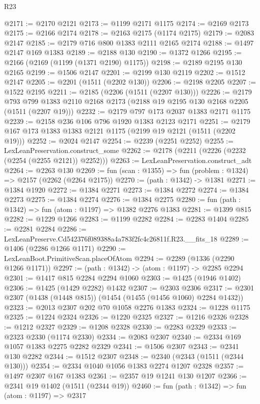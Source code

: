 \begin{lexlean}{R23}
\begin{coremodule}
@2171 := @2170 @2121
@2173 := @1199 @2171 @1175
@2174 := @2169 @2173
@2175 := @2166 @2174
@2178 := @2163 @2175 (@1174 @2175)
@2179 := @2083 @2147
@2185 := @2179 @716 @800 @1383 @2111 @2165 @2174
@2188 := @1497 @2147 @169 @1383
@2189 := @2188 @130
@2190 := @1372 @1266
@2195 := @2166 (@2169 (@1199 (@1371 @2190) @1175))
@2198 := @2189 @2195 @130 @2165
@2199 := @1506 @2147
@2201 := @2199 @130 @2119
@2202 := @1512 @2147
@2205 := @2201 (@1511 (@2202 @130))
@2206 := @2198 @2205
@2207 := @1522 @2195
@2211 := @2185 (@2206 (@1511 (@2207 @130)))
@2226 := @2179
    @793
    @799
    @1383
    @2110
    @2168
    @2173
    (@2188 @19 @2195 @130 @2168 @2205 (@1511 (@2207 @19)))
@2232 := @2179 @797 @173 @2037 @1383 @2171 @1175
@2239 := @2158 @236 @106 @796 @1920 @1383 @2123 @2171
@2251 := @2179 @167 @173 @1383 @1383 @2121 @1175 (@2199 @19 @2121 (@1511 (@2202 @19)))
@2252 := @2024 @2147
@2254 := @2239 (@2251 @2252)
@2255 := LexLeanPreservation.construct_some
@2262 := @2178 (@2211 (@2226 (@2232 (@2254 (@2255 @2121)) @2252)))
@2263 := LexLeanPreservation.construct_adt
@2264 := @2263 @130
@2269 := fun (scan : @1355) => fun (problem : @1324) => @2157 (@2262 (@2264 @2175))
@2270 := (path : @1342) -> @1381
@2271 := @1384 @1920
@2272 := @1384 @2271
@2273 := @1384 @2272
@2274 := @1384 @2273
@2275 := @1384 @2274
@2276 := @1384 @2275
@2280 := fun (path : @1342) => fun (atom : @1197) => @1382 @2276 @1383
@2281 := @1399 @815
@2282 := @1229 @1266
@2283 := @1199 @2282
@2284 := @2283 @1404
@2285 := @2281 @2284
@2286 := LexLeanPreserve.Cd542376f089388a4a783f2fc4c26811f.R23.__fits_18
@2289 := @1406 (@2286 @1266 @1171)
@2290 := LexLeanBoot.PrimitiveScan.placeOfAtom
@2294 := @2289 (@1336 (@2290 @1266 @1171))
@2297 := (path : @1342) -> (atom : @1197) -> @2285 @2294
@2301 := @1417 @815 @2284 @2294 @1060
@2303 := @1425 (@1946 @1402)
@2306 := @1425 (@1429 @2282) @1432
@2307 := @2303 @2306
@2317 := @2301 @2307 (@1438 (@1448 @815)) (@1454 (@1455 (@1456 @1060) @2284 @1432))
@2323 := @2013 @2307 @202 @70 @1058 @2276 @1383
@2324 := @1228 @1175
@2325 := @1224 @2324
@2326 := @1220 @2325
@2327 := @1216 @2326
@2328 := @1212 @2327
@2329 := @1208 @2328
@2330 := @2283 @2329
@2333 := @2323 @2330 (@1174 @2330)
@2334 := @2083 @2307
@2340 := @2334 @169 @1057 @1383 @2275 @2282 @2329
@2341 := @1506 @2307
@2343 := @2341 @130 @2282
@2344 := @1512 @2307
@2348 := @2340 (@2343 (@1511 (@2344 @130)))
@2354 := @2334 @1040 @1056 @1383 @2274 @1207 @2328
@2357 := @1497 @2307 @167 @1383
@2361 := @2357 @19 @1241 @130 @1207
@2366 := @2341 @19 @1402 (@1511 (@2344 @19))
@2460 := fun (path : @1342) =>
  fun (atom : @1197) =>
  @2317

\end{coremodule}
\end{lexlean}
